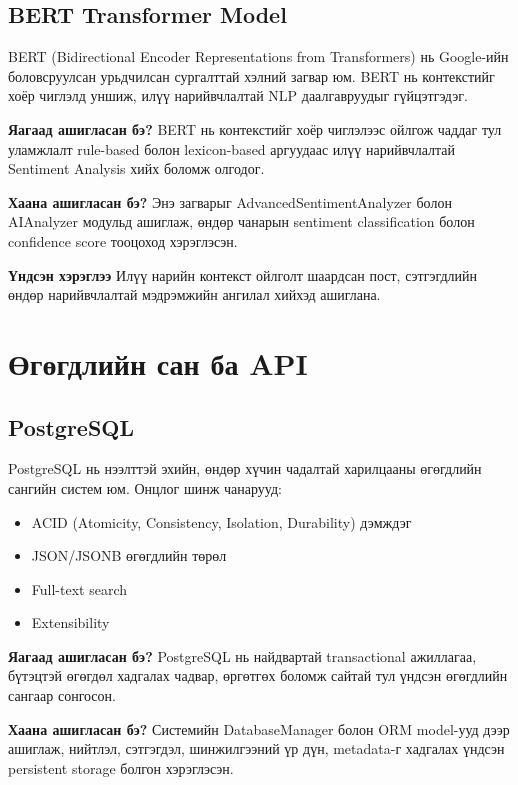 \documentclass[12pt,a4paper]{report}
\begin{document}
\subsection{BERT Transformer Model}

BERT (Bidirectional Encoder Representations from Transformers) нь Google-ийн боловсруулсан урьдчилсан сургалттай хэлний загвар юм. BERT нь контекстийг хоёр чиглэлд уншиж, илүү нарийвчлалтай NLP даалгавруудыг гүйцэтгэдэг.


\textbf{Яагаад ашигласан бэ?} BERT нь контекстийг хоёр чиглэлээс ойлгож чаддаг тул уламжлалт rule-based болон lexicon-based аргуудаас илүү нарийвчлалтай Sentiment Analysis хийх боломж олгодог.

\textbf{Хаана ашигласан бэ?} Энэ загварыг AdvancedSentimentAnalyzer болон AIAnalyzer модульд ашиглаж, өндөр чанарын sentiment classification болон confidence score тооцоход хэрэглэсэн.

\textbf{Үндсэн хэрэглээ} Илүү нарийн контекст ойлголт шаардсан пост, сэтгэгдлийн өндөр нарийвчлалтай мэдрэмжийн ангилал хийхэд ашиглана.

\section{Өгөгдлийн сан ба API}

\subsection{PostgreSQL}

PostgreSQL нь нээлттэй эхийн, өндөр хүчин чадалтай харилцааны өгөгдлийн сангийн систем юм. Онцлог шинж чанарууд:

\begin{itemize}
    \item ACID (Atomicity, Consistency, Isolation, Durability) дэмждэг
    \item JSON/JSONB өгөгдлийн төрөл
    \item Full-text search
    \item Extensibility
\end{itemize}

\textbf{Яагаад ашигласан бэ?} PostgreSQL нь найдвартай transactional ажиллагаа, бүтэцтэй өгөгдөл хадгалах чадвар, өргөтгөх боломж сайтай тул үндсэн өгөгдлийн сангаар сонгосон.

\textbf{Хаана ашигласан бэ?} Системийн DatabaseManager болон ORM model-ууд дээр ашиглаж, нийтлэл, сэтгэгдэл, шинжилгээний үр дүн, metadata-г хадгалах үндсэн persistent storage болгон хэрэглэсэн.
\end{document}

